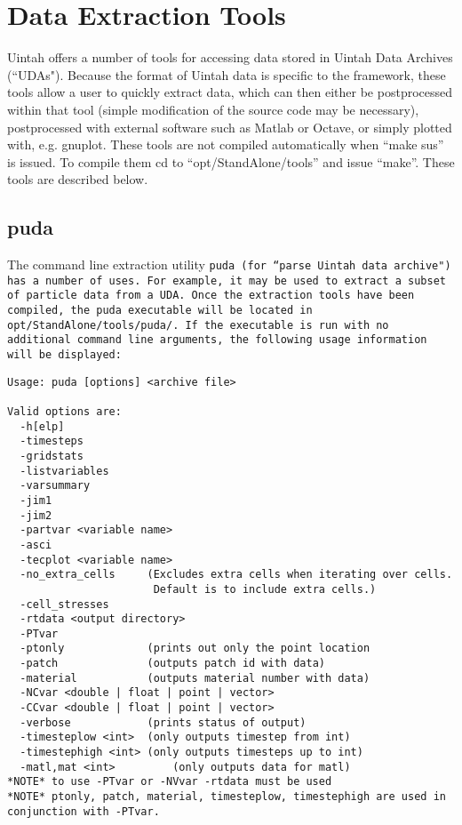 \chapter{Data Extraction Tools}

Uintah offers a number of tools for accessing data stored in Uintah
Data Archives (``UDAs").  Because the format of Uintah data is
specific to the framework, these tools allow a user to quickly extract
data, which can then either be postprocessed within that tool (simple
modification of the source code may be necessary), postprocessed with
external software such as Matlab or Octave, or simply plotted with,
e.g. gnuplot.  These tools are not compiled automatically when ``make
sus'' is issued.  To compile them cd to ``opt/StandAlone/tools'' and
issue ``make''.  These tools are described below.

\section{puda}

The command line extraction utility \tt puda \normalfont (for ``parse
Uintah data archive") has a number of uses.  For example, it may be
used to extract a subset of particle data from a UDA.  Once the
extraction tools have been compiled, the puda executable will be
located in \tt opt/StandAlone/tools/puda/. \normalfont If the
executable is run with no additional command line arguments, the
following usage information will be displayed:

\begin{Verbatim}[fontsize=\footnotesize]
Usage: puda [options] <archive file>

Valid options are:
  -h[elp]
  -timesteps
  -gridstats
  -listvariables
  -varsummary
  -jim1
  -jim2
  -partvar <variable name>
  -asci
  -tecplot <variable name>
  -no_extra_cells     (Excludes extra cells when iterating over cells.
                       Default is to include extra cells.)
  -cell_stresses
  -rtdata <output directory>
  -PTvar
  -ptonly             (prints out only the point location
  -patch              (outputs patch id with data)
  -material           (outputs material number with data)
  -NCvar <double | float | point | vector>
  -CCvar <double | float | point | vector>
  -verbose            (prints status of output)
  -timesteplow <int>  (only outputs timestep from int)
  -timestephigh <int> (only outputs timesteps up to int)
  -matl,mat <int>         (only outputs data for matl)
*NOTE* to use -PTvar or -NVvar -rtdata must be used
*NOTE* ptonly, patch, material, timesteplow, timestephigh are used in conjunction with -PTvar.
\end{Verbatim}

